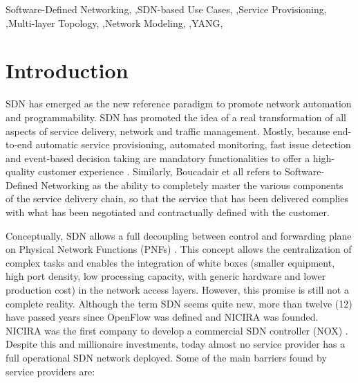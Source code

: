 \documentclass[a4paper,fleqn]{cas-dc}
\begin{document}


\begin{keywords}
Software-Defined Networking,
\sep SDN-based Use Cases, 
\sep Service Provisioning,
\sep Multi-layer Topology,
\sep Network Modeling, 
\sep YANG,  
\end{keywords}

\maketitle

\section{Introduction}
SDN has emerged as the new reference paradigm to promote network automation and programmability. SDN has promoted the idea of a real transformation of all aspects of service delivery, network and traffic management. Mostly, because end-to-end automatic service provisioning, automated monitoring, fast issue detection and event-based decision taking are mandatory functionalities to offer a high-quality customer experience \cite{ordonez2017network,ong2017onf}. Similarly, Boucadair et all  \cite{boucadair2014software} refers to Software-Defined Networking as the ability to completely master the various components of the service delivery chain, so that the service that has been delivered complies with what has been negotiated and contractually defined with the customer.

Conceptually, SDN allows a full decoupling between control and forwarding plane on Physical Network Functions (PNFs) \cite{brief2014openflow}. This concept allows the centralization of complex tasks and enables the integration of white boxes (smaller equipment, high port density, low processing capacity, with generic hardware and lower production cost) in the network access layers. However, this promise is still not a complete reality. Although the term SDN seems quite new, more than twelve (12) have passed years since OpenFlow \cite{brief2014openflow} was defined and NICIRA was founded. NICIRA was the first company to develop a commercial SDN controller (NOX) \cite{gude2008nox,tavakoli2009applying}. Despite this and millionaire investments, today almost no service provider has a full operational SDN network deployed. Some of the main barriers found by service providers are:
\end{document}

